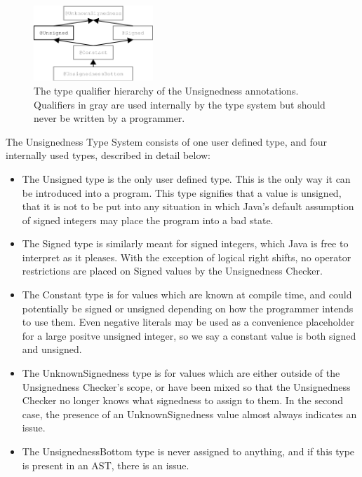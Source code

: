 \documentclass{sigplanconf}
\begin{document}
\begin{figure}
    \centering
    \includegraphics[width=0.4\textwidth]{unsignedness}
    \caption{The type qualifier hierarchy of the Unsignedness annotations.
Qualifiers in gray are used internally by the type system but should never be written by a programmer.}
    \label{fig:my_label}
\end{figure}

The Unsignedness Type System consists of one user defined type, and four internally used types, described in detail below:

\begin{itemize}
  \item The Unsigned type is the only user defined type. This is the only way it can be introduced into a program. This type signifies that a value is unsigned, that it is not to be put into any situation in which Java's default assumption of signed integers may place the program into a bad state.
  \item The Signed type is similarly meant for signed integers, which Java is free to interpret as it pleases. With the exception of logical right shifts, no operator restrictions are placed on Signed values by the Unsignedness Checker.
  \item The Constant type is for values which are known at compile time, and could potentially be signed or unsigned depending on how the programmer intends to use them. Even negative literals may be used as a convenience placeholder for a large positve unsigned integer, so we say a constant value is both signed and unsigned.
  \item The UnknownSignedness type is for values which are either outside of the Unsignedness Checker's scope, or have been mixed so that the Unsignedness Checker no longer knows what signedness to assign to them. In the second case, the presence of an UnknownSignedness value almost always indicates an issue.
  \item The UnsignednessBottom type is never assigned to anything, and if this type is present in an AST, there is an issue.
\end{itemize}
\end{document}

